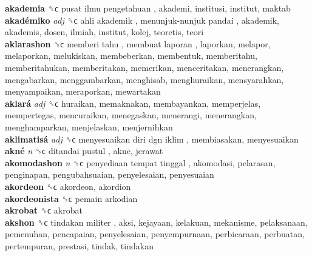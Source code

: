 \textbf{akademia} ␝ϲ   pusat ilmu pengetahuan , akademi, institusi, institut, maktab  \\
\textbf{akadémiko} \emph{adj}  ␝ϲ   ahli akademik ,  menunjuk-nunjuk pandai , akademik, akademis, dosen, ilmiah, institut, kolej, teoretis, teori  \\
\textbf{aklarashon} ␝ϲ   memberi tahu ,  membuat laporan , laporkan, melapor, melaporkan, melukiskan, membeberkan, membentuk, memberitahu, memberitahukan, memberitakan, memerikan, menceritakan, menerangkan, mengabarkan, menggambarkan, menghisab, menghuraikan, mensyarahkan, menyampaikan, meraporkan, mewartakan  \\
\textbf{aklará} \emph{adj}  ␝ϲ  huraikan, memaknakan, membayankan, memperjelas, mempertegas, mencuraikan, menegaskan, menerangi, menerangkan, menghamparkan, menjelaskan, menjernihkan  \\
\textbf{aklimatisá} \emph{adj}  ␝ϲ   menyesuaikan diri dgn iklim , membiasakan, menyesuaikan  \\
\textbf{akné} \emph{n}  ␝ϲ   ditandai pustul , akne, jerawat  \\
\textbf{akomodashon} \emph{n}  ␝ϲ   penyediaan tempat tinggal , akomodasi, pelarasan, penginapan, pengubahsuaian, penyelesaian, penyesuaian  \\
\textbf{akordeon} ␝ϲ  akordeon, akordion  \\
\textbf{akordeonista} ␝ϲ   pemain arkodian   \\
\textbf{akrobat} ␝ϲ  akrobat  \\
\textbf{akshon} ␝ϲ   tindakan militer , aksi, kejayaan, kelakuan, mekanisme, pelaksanaan, pemenuhan, pencapaian, penyelesaian, penyempurnaan, perbicaraan, perbuatan, pertempuran, prestasi, tindak, tindakan  \\
